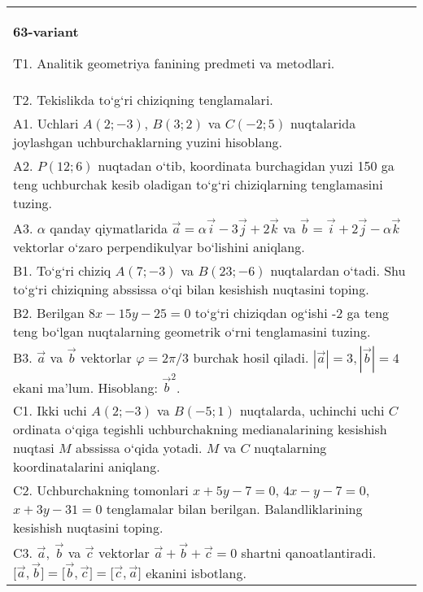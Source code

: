 \documentclass{article}
\begin{document}
\begin{tabular}{m{17cm}}
\textbf{63-variant}
\newline

T1. Analitik geometriya fanining predmeti va metodlari.
 \\
T2. 
Tekislikda to‘g‘ri chiziqning tenglamalari.
 \\
A1. 
Uchlari $A (2;-3) $, $B (3;2) $ va $C (-2;5) $
nuqtalarida joylashgan uchburchaklarning yuzini hisoblang.
 \\
A2. 
$P (12;6)$ nuqtadan o‘tib, koordinata burchagidan
yuzi 150 ga teng uchburchak kesib oladigan to‘g‘ri chiziqlarning
tenglamasini tuzing.
 \\
A3. 
$\alpha$
qanday qiymatlarida 
$\overrightarrow{a} = \alpha\overrightarrow{i} - 3\overrightarrow{j} + 2\overrightarrow{k}$
va
$\overrightarrow{b} = \overrightarrow{i} + 2\overrightarrow{j} - \alpha\overrightarrow{k}$
vektorlar o‘zaro perpendikulyar bo‘lishini aniqlang.
 \\
B1. 
To‘g‘ri chiziq \(A (7;-3) \) va \(B (23;-6) \) nuqtalardan o‘tadi.
Shu to‘g‘ri chiziqning abssissa o‘qi bilan kesishish nuqtasini toping.
 \\
B2. 
Berilgan \(8x-15y-25=0\) to‘g‘ri chiziqdan og‘ishi -2 ga teng
teng bo‘lgan nuqtalarning geometrik o‘rni tenglamasini tuzing.
 \\
B3. 
$\vec{a}$ va $\vec{b}$ vektorlar $\varphi = 2\pi/3$ burchak hosil qiladi. $|\vec{a}| = 3,|\vec{b}| = 4$ ekani ma’lum. Hisoblang:
${\vec{b}}^{2}$.
 \\
C1. 
Ikki uchi \(A (2; - 3) \) va \(B (-5;1) \) nuqtalarda,
uchinchi uchi $C$ ordinata o‘qiga tegishli uchburchakning
medianalarining kesishish nuqtasi $M$ abssissa o‘qida yotadi.
$M$ va $C$ nuqtalarning koordinatalarini aniqlang.
 \\
C2. 
Uchburchakning tomonlari \(x + 5y - 7 = 0\),
\(4x - y - 7 = 0\), \(x + 3y - 31 = 0\) tenglamalar bilan berilgan.
Balandliklarining kesishish nuqtasini toping.
 \\
C3. 
\(\vec{a},\ \vec{b}\) va \(\vec{c}\) vektorlar \(\vec{a} + \vec{b} + \vec{c} = 0\) shartni qanoatlantiradi. \(\lbrack\vec{a},\vec{b}\rbrack = \lbrack\vec{b},\vec{c}\rbrack = \lbrack\vec{c},\vec{a}\rbrack\) ekanini isbotlang.
 \\

\end{tabular}
\vspace{1cm}
\end{document}
